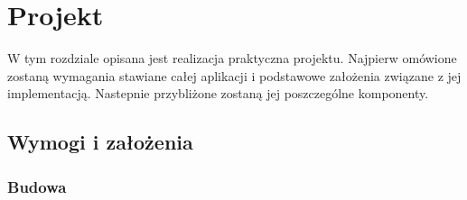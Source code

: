 \chapter{Projekt}
\label{cha:projekt}

W tym rozdziale opisana jest realizacja praktyczna projektu. Najpierw omówione zostaną wymagania stawiane całej aplikacji i podstawowe
założenia związane z jej implementacją. Nastepnie przybliżone zostaną jej poszczególne komponenty.

\section{Wymogi i założenia}
\label{sec:wymogi}

\subsection{Budowa}
\label{subs:budowaAplikacji}

